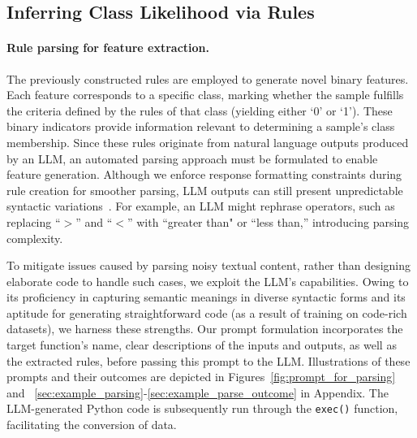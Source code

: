 \subsection{Inferring Class Likelihood via Rules}
\label{Sec:training}

\paragraph{Rule parsing for feature extraction.} The previously constructed rules are employed to generate novel binary features. Each feature corresponds to a specific class, marking whether the sample fulfills the criteria defined by the rules of that class (yielding either ‘0’ or ‘1’). These binary indicators provide information relevant to determining a sample's class membership. Since these rules originate from natural language outputs produced by an LLM, an automated parsing approach must be formulated to enable feature generation. Although we enforce response formatting constraints during rule creation for smoother parsing, LLM outputs can still present unpredictable syntactic variations~\cite{kovavc2023large}. For example, an LLM might rephrase operators, such as replacing ``$>$” and ``$<$” with ``greater than" or ``less than,” introducing parsing complexity.

To mitigate issues caused by parsing noisy textual content, rather than designing elaborate code to handle such cases, we exploit the LLM's capabilities. Owing to its proficiency in capturing semantic meanings in diverse syntactic forms and its aptitude for generating straightforward code (as a result of training on code-rich datasets), we harness these strengths. Our prompt formulation incorporates the target function’s name, clear descriptions of the inputs and outputs, as well as the extracted rules, before passing this prompt to the LLM. Illustrations of these prompts and their outcomes are depicted in Figures~\ref{fig:prompt_for_parsing} and ~\ref{sec:example_parsing}-\ref{sec:example_parse_outcome} in Appendix. The LLM-generated Python code is subsequently run through the \texttt{exec()} function, facilitating the conversion of data.

\vspace*{-0.12in}
